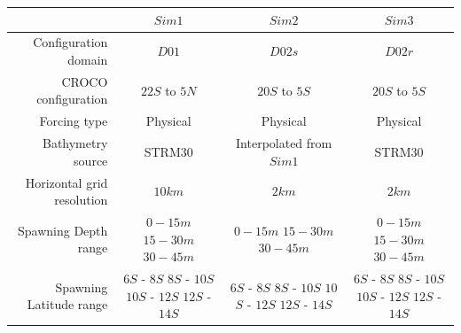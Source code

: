 \begin{landscape}
\begin{table}[H]
\centering
\begin{tabular}{r|c|c|c}
\hline
                   &
    \textbf{$Sim 1$} &
    \textbf{$Sim 2$} &
    \textbf{$Sim 3$} \\
\hline
Configuration domain &
	$D01$  		     &
	$D02s$ 		     &
	$D02r$ 			 \\
CROCO configuration        			   &
	$22$\textdegree $S$ to $5$\textdegree $N$ &
	$20$\textdegree $S$ to $5$\textdegree $S$ &
	$20$\textdegree $S$ to $5$\textdegree $S$ \\
Forcing type &
	Physical &
	Physical &
	Physical \\
Bathymetry source                         &
	STRM30                                &
	\makecell{Interpolated\\from $Sim 1$} &
	STRM30 								 \\
Horizontal grid resolution &
	$10 km$                  &
	$2 km$                   &
	$2 km$                   \\
Spawning Depth range         &
	\makecell{$0-15 m$ \\ $15-30 m$ \\ $30-45 m$}&
	\makecell{$0-15 m$ \\ $15-30 m$ \\ $30-45 m$}&
	\makecell{$0-15 m$ \\ $15-30 m$ \\ $30-45 m$}\\
Spawning Latitude range      &
	\makecell{$6$\textdegree $S$ - $8$\textdegree $S$  \\
			  $8$\textdegree $S$ - $10$\textdegree $S$  \\
			  $10$\textdegree $S$ - $12$\textdegree $S$ \\
			  $12$\textdegree $S$ - $14$\textdegree $S$} &
	\makecell{$6$\textdegree $S$ - $8$\textdegree $S$   \\
			  $8$\textdegree $S$ - $10$\textdegree $S$  \\
			  $10$\textdegree $S$ - $12$\textdegree $S$ \\
			  $12$\textdegree $S$ - $14$\textdegree $S$} &
	\makecell{$6$\textdegree $S$ - $8$\textdegree $S$   \\
			  $8$\textdegree $S$ - $10$\textdegree $S$  \\
			  $10$\textdegree $S$ - $12$\textdegree $S$ \\
			  $12$\textdegree $S$ - $14$\textdegree $S$} \\

\end{tabular}
\end{table}
\end{landscape}
